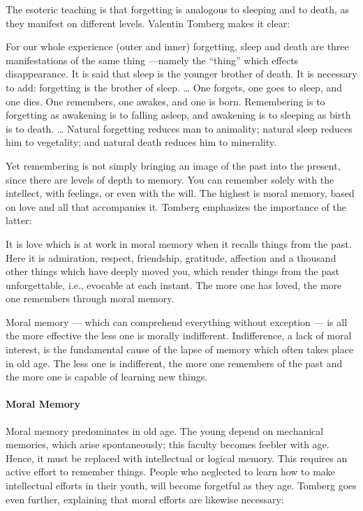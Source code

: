 The esoteric teaching is that forgetting is analogous to sleeping and to death, as they manifest on different levels. Valentin Tomberg makes it clear:

\begin{quotex}
For our whole experience (outer and inner) forgetting, sleep and death are three manifestations of the same thing —namely the “thing” which effects disappearance. It is said that sleep is the younger brother of death. It is necessary to add: forgetting is the brother of sleep. … One forgets, one goes to sleep, and one dies. One remembers, one awakes, and one is born. Remembering is to forgetting as awakening is to falling asleep, and awakening is to sleeping as birth is to death. … Natural forgetting reduces man to animality; natural sleep reduces him to vegetality; and natural death reduces him to minerality. 


\end{quotex}

Yet remembering is not simply bringing an image of the past into the present, since there are levels of depth to memory. You can remember solely with the intellect, with feelings, or even with the will. The highest is moral memory, based on love and all that accompanies it. Tomberg emphasizes the importance of the latter:

\begin{quotex}
It is love which is at work in moral memory when it recalls things from the past. Here it is admiration, respect, friendship, gratitude, affection and a thousand other things which have deeply moved you, which render things from the past unforgettable, i.e., evocable at each instant. The more one has loved, the more one remembers through moral memory.

Moral memory — which can comprehend everything without exception — is all the more effective the less one is morally indifferent. Indifference, a lack of moral interest, is the fundamental cause of the lapse of memory which often takes place in old age. The less one is indifferent, the more one remembers of the past and the more one is capable of learning new things. 

\end{quotex}
\paragraph{Moral Memory}
Moral memory predominates in old age. The young depend on mechanical memories, which arise spontaneously; this faculty becomes feebler with age. Hence, it must be replaced with intellectual or logical memory. This requires an active effort to remember things. People who neglected to learn how to make intellectual efforts in their youth, will become forgetful as they age. Tomberg goes even further, explaining that moral efforts are likewise necessary:

